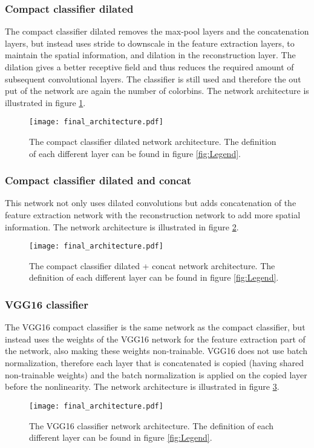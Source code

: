 \subsubsection{Compact classifier dilated}
The compact classifier dilated removes the max-pool layers and the concatenation layers, but instead uses stride to downscale in the feature extraction layers, to maintain the spatial information, and dilation in the reconstruction layer. The dilation gives a better receptive field and thus reduces the required amount of subsequent convolutional layers. The classifier is still used and therefore the out put of the network are again the number of colorbins. The network architecture is illustrated in figure \ref{fig:compact_classifier_dilated}.
\begin{figure}[H]
	\centering
	\texttt{[image: final\_architecture.pdf]}
	\caption{The compact classifier dilated network architecture. The definition of each different layer can be found in figure \ref{fig:Legend}.}
	\label{fig:compact_classifier_dilated}
\end{figure}

\subsubsection{Compact classifier dilated and concat}
This network not only uses dilated convolutions but adds concatenation of the feature extraction network with the reconstruction network to add more spatial information. The network architecture is illustrated in figure \ref{fig:compact_classifier_dilated_concat}.
\begin{figure}[H]
	\centering
	\texttt{[image: final\_architecture.pdf]}
	\caption{The compact classifier dilated + concat network architecture. The definition of each different layer can be found in figure \ref{fig:Legend}.}
	\label{fig:compact_classifier_dilated_concat}
\end{figure}


\subsubsection{VGG16 classifier}
The VGG16 compact classifier is the same network as the compact classifier, but instead uses the weights of the VGG16 network for the feature extraction part of the network, also making these weights non-trainable. VGG16 does not use batch normalization, therefore each layer that is concatenated is copied (having shared non-trainable weights) and the batch normalization is applied on the copied layer before the nonlinearity. The network architecture is illustrated in figure \ref{fig:VGG_classifier}.
\begin{figure}[H]
	\centering
	\texttt{[image: final\_architecture.pdf]}
	\caption{The VGG16 classifier network architecture. The definition of each different layer can be found in figure \ref{fig:Legend}.}
	\label{fig:VGG_classifier}
\end{figure}







